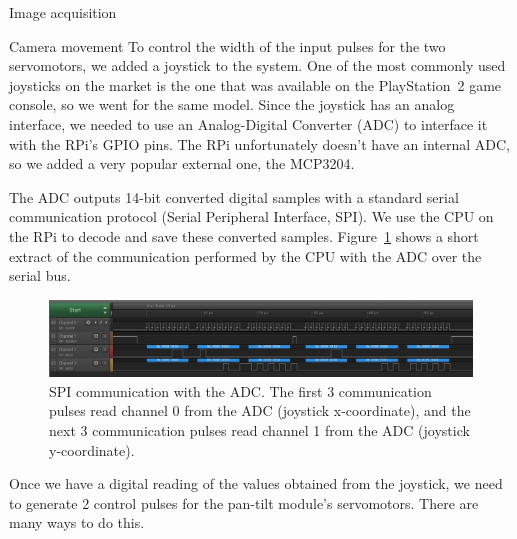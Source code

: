 \documentclass[10pt]{article}
\begin{document}
\begin{section}{Image acquisition}
\begin{subsubsection}{Camera movement}
        To control the width of the input pulses for the two servomotors, we added a joystick to the system. One of the most commonly used joysticks on the market is the one that was available on the PlayStation~2 game console, so we went for the same model. Since the joystick has an {analog} interface, we needed to use an Analog-Digital Converter (ADC) to interface it with the RPi's GPIO pins. The RPi unfortunately doesn't have an internal ADC, so we added a very popular external one, the MCP3204.

        \medskip

        The ADC outputs 14-bit converted digital samples with a standard serial communication protocol (Serial Peripheral Interface, SPI). We use the CPU on the RPi to decode and save these converted samples. Figure~\ref{fig:adc_spi_communication} shows a short extract of the communication performed by the CPU with the ADC over the serial bus.

        \begin{figure}[!h]
            \begin{center}
                \includegraphics[width=\textwidth]{fig/mcp3204_spi_communication.jpg}
                \caption{SPI communication with the ADC. The first 3 communication pulses read channel 0 from the ADC (joystick x-coordinate), and the next 3 communication pulses read channel 1 from the ADC (joystick y-coordinate).}
                \label{fig:adc_spi_communication}
            \end{center}
        \end{figure}

        \newpage

        Once we have a digital reading of the values obtained from the joystick, we need to generate 2 control pulses for the pan-tilt module's servomotors. There are many ways to do this.


\end{subsubsection}
\end{section}
\end{document}
